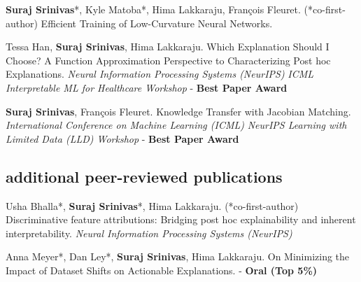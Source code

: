 \documentclass[11pt, a4paper, english]{moderncv}        %
\newcommand{\cvsubsection}[1]{\vspace{0.3cm}\subsection{\large{{#1}}}}
\begin{document}
 {\textbf{Suraj Srinivas}*, Kyle Matoba*, Hima Lakkaraju, Fran\c{c}ois Fleuret. (*co-first-author) \newline Efficient Training of Low-Curvature Neural Networks. 
}\vspace*{0.25em}

 {Tessa Han, \textbf{Suraj Srinivas}, Hima Lakkaraju. 
\newline Which Explanation Should I Choose? A Function Approximation Perspective to Characterizing Post hoc Explanations.
\newline \textit{Neural Information Processing Systems (NeurIPS)} \newline \textit{ICML Interpretable ML for Healthcare Workshop} - \textbf{Best Paper Award}}
\vspace*{0.25em}

\vspace*{0.25em}

 {\textbf{Suraj Srinivas}, Fran\c{c}ois Fleuret.
\newline Knowledge Transfer with Jacobian Matching.
\newline \textit{International Conference on Machine Learning (ICML)}
\newline \textit{NeurIPS Learning with Limited Data (LLD) Workshop} - \textbf{Best Paper Award}
}
\vspace*{0.25em}

\cvsubsection{additional peer-reviewed publications}
 {Usha Bhalla*, \textbf{Suraj Srinivas}*, Hima Lakkaraju. (*co-first-author) \newline Discriminative feature attributions: Bridging post hoc explainability and inherent interpretability.
\newline \textit{Neural Information Processing Systems (NeurIPS)}}
\vspace*{0.25em}

 {Anna Meyer*, Dan Ley*, \textbf{Suraj Srinivas}, Hima Lakkaraju. \newline On Minimizing the Impact of Dataset Shifts on Actionable Explanations.  - \textbf{Oral (Top 5\%)}
}
\vspace*{0.25em}
\end{document}
